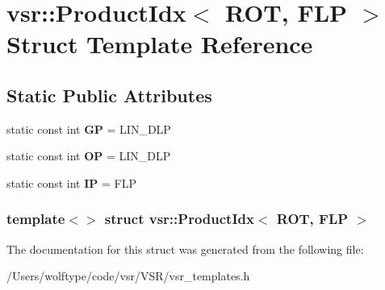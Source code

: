 \hypertarget{structvsr_1_1_product_idx_3_01_r_o_t_00_01_f_l_p_01_4}{\section{vsr\-:\-:Product\-Idx$<$ R\-O\-T, F\-L\-P $>$ Struct Template Reference}
\label{structvsr_1_1_product_idx_3_01_r_o_t_00_01_f_l_p_01_4}
}
\subsection*{Static Public Attributes}
\begin{DoxyCompactItemize}
\item 
\hypertarget{structvsr_1_1_product_idx_3_01_r_o_t_00_01_f_l_p_01_4_a68977b4bf93b90a087427817cb3785b8}{static const int {\bfseries G\-P} = L\-I\-N\-\_\-\-D\-L\-P}\label{structvsr_1_1_product_idx_3_01_r_o_t_00_01_f_l_p_01_4_a68977b4bf93b90a087427817cb3785b8}

\item 
\hypertarget{structvsr_1_1_product_idx_3_01_r_o_t_00_01_f_l_p_01_4_a400aea447fb386ae5effcf4bfde8eb8e}{static const int {\bfseries O\-P} = L\-I\-N\-\_\-\-D\-L\-P}\label{structvsr_1_1_product_idx_3_01_r_o_t_00_01_f_l_p_01_4_a400aea447fb386ae5effcf4bfde8eb8e}

\item 
\hypertarget{structvsr_1_1_product_idx_3_01_r_o_t_00_01_f_l_p_01_4_aebd9170a5961269a6f34ba690c28a624}{static const int {\bfseries I\-P} = F\-L\-P}\label{structvsr_1_1_product_idx_3_01_r_o_t_00_01_f_l_p_01_4_aebd9170a5961269a6f34ba690c28a624}

\end{DoxyCompactItemize}
\subsubsection*{template$<$$>$ struct vsr\-::\-Product\-Idx$<$ R\-O\-T, F\-L\-P $>$}



The documentation for this struct was generated from the following file\-:\begin{DoxyCompactItemize}
\item 
/\-Users/wolftype/code/vsr/\-V\-S\-R/vsr\-\_\-templates.\-h\end{DoxyCompactItemize}
